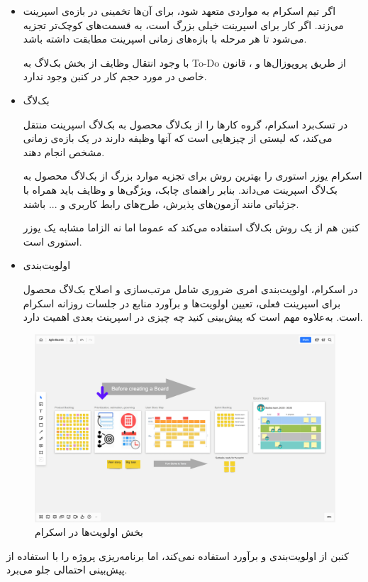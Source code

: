 {\begin{itemize}
\item اگر تیم اسکرام به مواردی متعهد شود، برای آن‌ها تخمینی در بازه‌ی اسپرینت می‌زند. اگر کار برای اسپرینت خیلی بزرگ است، به قسمت‌های کوچک‌تر تجزیه می‌شود تا هر مرحله با بازه‌های زمانی اسپرینت مطابقت داشته باشد.

با وجود انتقال وظایف از بخش بک‌لاگ به To-Do از طریق پروپوزال‌ها و ، قانون خاصی در مورد حجم کار در کنبن وجود ندارد.


\item بک‌لاگ

در تسک‌برد اسکرام، گروه کار‌ها را از بک‌لاگ محصول به بک‌لاگ اسپرینت منتقل می‌کند، که لیستی از چیزهایی است که آنها وظیفه دارند در یک بازه‌ی زمانی مشخص انجام دهند.

اسکرام یوزر استوری را بهترین روش برای تجزیه موارد بزرگ از بک‌لاگ محصول به بک‌لاگ اسپرینت می‌داند. بنابر راهنمای چابک، ویژگی‌ها و وظایف باید همراه با جزئیاتی مانند آزمون‌های پذیرش، طرح‌های رابط کاربری و ... باشند.

کنبن هم از یک روش بک‌لاگ استفاده می‌کند که عموما اما نه الزاما مشابه یک یوزر استوری است.


\item اولویت‌بندی

در اسکرام، اولویت‌بندی امری ضروری شامل مرتب‌سازی و اصلاح بک‌لاگ محصول برای اسپرینت فعلی، تعیین اولویت‌ها و برآورد منابع در جلسات روزانه اسکرام است. به‌علاوه مهم است که پیش‌بینی کنید چه چیزی در اسپرینت بعدی اهمیت دارد.
\end{itemize}
    
\begin{figure}
	\centering
	\includegraphics[scale=0.3]{figs/4-2-c}
	\caption{بخش اولویت‌ها در اسکرام}
\end{figure}

کنبن از اولویت‌بندی و برآورد استفاده نمی‌کند، اما برنامه‌ریزی پروژه را با استفاده از پیش‌بینی احتمالی جلو می‌برد.

}

